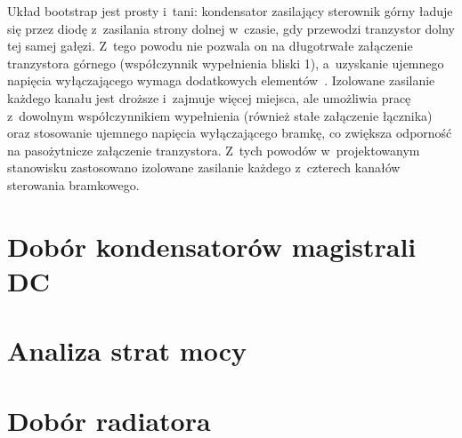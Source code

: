 Układ bootstrap jest prosty i~tani: kondensator zasilający sterownik górny
ładuje się przez diodę z~zasilania strony dolnej w~czasie, gdy przewodzi
tranzystor dolny tej samej gałęzi. Z~tego powodu nie pozwala on na długotrwałe
załączenie tranzystora górnego (współczynnik wypełnienia bliski 1), a~uzyskanie
ujemnego napięcia wyłączającego wymaga dodatkowych elementów~\cite[rozdz.~5]{balogh2018}.
Izolowane zasilanie każdego kanału jest droższe i~zajmuje więcej miejsca, ale
umożliwia pracę z~dowolnym współczynnikiem wypełnienia (również stałe
załączenie łącznika) oraz stosowanie ujemnego napięcia wyłączającego bramkę,
co zwiększa odporność na pasożytnicze załączenie tranzystora. Z~tych powodów
w~projektowanym stanowisku zastosowano izolowane zasilanie każdego z~czterech
kanałów sterowania bramkowego.


\section{Dobór kondensatorów magistrali DC}
\label{sec: Dobór kondensatorów magistrali DC}

\section{Analiza strat mocy}
\label{sec: Analiza strat mocy}

\section{Dobór radiatora}
\label{sec: Dobór radiatora}
